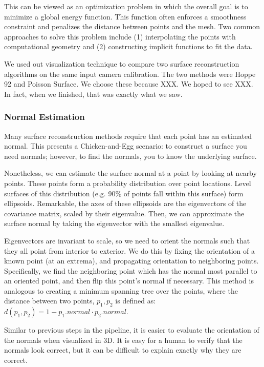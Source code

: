 \documentclass[10pt,twocolumn,letterpaper]{article}
\begin{document}
This can be viewed as an optimization problem in which the overall goal is to minimize a global energy function. This function often enforces a smoothness constraint and penalizes the distance between points and the mesh.\cite{mesh_opt}  Two common approaches to solve this problem include (1) interpolating the points with computational geometry and (2) constructing implicit functions to fit the data.

We used out visualization technique to compare two surface reconstruction algorithms on the same input camera calibration. The two methods were Hoppe 92 and Poisson Surface. We choose these because XXX. We hoped to see XXX. In fact, when we finished, that was exactly what we saw.

\subsubsection{Normal Estimation}

Many surface reconstruction methods require that each point has an estimated normal. This presents a Chicken-and-Egg scenario: to construct a surface you need normals; however, to find the normals, you to know the underlying surface.

Nonetheless, we can estimate the surface normal at a point by looking at nearby points. These points form a probability distribution over point locations. Level surfaces of this distribution (e.g. 90\% of points fall within this surface) form ellipsoids. Remarkable, the axes of these ellipsoids are the eigenvectors of the covariance matrix, scaled by their eigenvalue. Then, we can approximate the surface normal by taking the eigenvector with the smallest eigenvalue.

Eigenvectors are invariant to scale, so we need to orient the normals such that they all point from interior to exterior. We do this by fixing the orientation of a known point (at an extrema), and propagating orientation to neighboring points. Specifically, we find the neighboring point which has the normal most parallel to an oriented point, and then flip this point's normal if necessary. This method is analogous to creating a minimum spanning tree over the points, where the distance between two points, $p_1, p_2$ is defined as: $d(p_1, p_2) = 1-p_1.normal \cdot p_2.normal$.

Similar to previous steps in the pipeline, it is easier to evaluate the orientation of the normals when visualized in 3D. It is easy for a human to verify that the normals look correct, but it can be difficult to explain exactly why they are correct.
\end{document}

